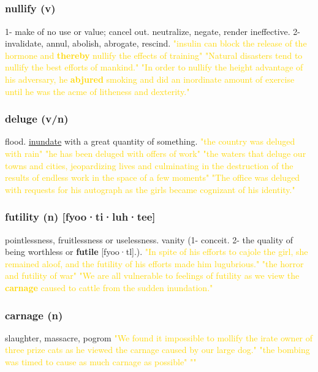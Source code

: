 \documentclass{proc}
\begin{document}
	\newpage
	\setcounter{section}{44}
	\setcounter{subsection}{0}
	
	
	\subsection{}
	\subsubsection{\textcolor{brickred}{nullify} (v)}
	1- make of no use or value; cancel out. neutralize, negate, render ineffective.
	2- invalidate, annul, abolish, abrogate, rescind.
	\textcolor{gold}{"insulin can block the release of the hormone and \textbf{thereby} nullify the effects of training" "Natural disasters tend to nullify the best efforts of mankind." "In order to nullify the height advantage of his adversary, he \textbf{abjured} smoking and did an inordinate amount of exercise until he was the acme of litheness and dexterity."}
	
	\subsubsection{\textcolor{brickred}{deluge} (v/n)}
	flood. \underline{inundate} with a great quantity of something.
	\textcolor{gold}{"the country was deluged with rain" "he has been deluged with offers of work" "the waters that deluge our towns and cities, jeopardizing lives and culminating in the destruction of the results of endless work in the space of a few moments" "The office was deluged with requests for his autograph as the girls became cognizant of his identity."}
	
	\subsubsection{\textcolor{brickred}{futility} (n) [fyoo·ti·luh·tee]}
	pointlessness, fruitlessness or uselessness. vanity (1- conceit. 2- the quality of being worthless or \textbf{futile} [fyoo·tl].).
	\textcolor{gold}{"In spite of his efforts to cajole the girl, she remained aloof, and the futility of his efforts made him lugubrious." "the horror and futility of war" "We are all vulnerable to feelings of futility as we view the \textbf{carnage} caused to cattle from the sudden inundation."}
	
	\subsubsection{\textcolor{brickred}{carnage} (n)}
	slaughter, massacre, pogrom
	\textcolor{gold}{"We found it impossible to mollify the irate owner of three prize cats as he viewed the carnage caused by our large dog." "the bombing was timed to cause as much carnage as possible" ""}
	
\end{document}
